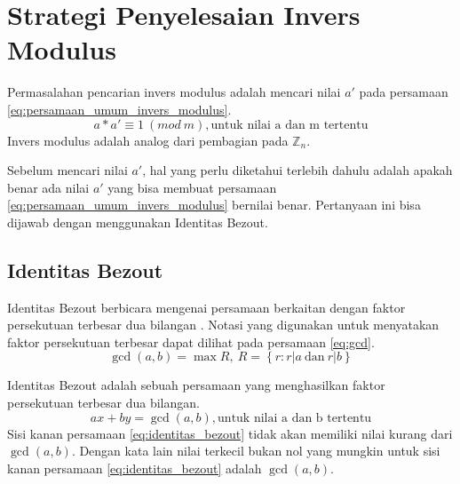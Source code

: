 \section{Strategi Penyelesaian Invers Modulus}

Permasalahan pencarian invers modulus adalah mencari nilai $ a' $ pada persamaan \eqref{eq:persamaan_umum_invers_modulus}.
\begin{equation}
a * a' \equiv 1\ (mod\ m), \text{untuk nilai a dan m tertentu}
\label{eq:persamaan_umum_invers_modulus}
\end{equation}
Invers modulus adalah analog dari pembagian pada $ \mathbb{Z}_n $.

Sebelum mencari nilai $ a' $, hal yang perlu diketahui terlebih dahulu adalah apakah benar ada nilai $ a' $ yang bisa membuat persamaan \eqref{eq:persamaan_umum_invers_modulus} bernilai benar. Pertanyaan ini bisa dijawab dengan menggunakan Identitas Bezout.

\subsection{Identitas Bezout}

Identitas Bezout berbicara mengenai persamaan berkaitan dengan faktor persekutuan terbesar dua bilangan \cite{brilliant_bezout}. Notasi yang digunakan untuk menyatakan faktor persekutuan terbesar dapat dilihat pada persamaan \eqref{eq:gcd}.
\begin{equation}
\gcd⁡(a,b)=\max R,\ R=\left\{r:r|a\ \text{dan} \ r|b\right\}
\label{eq:gcd}
\end{equation}

Identitas Bezout adalah sebuah persamaan yang menghasilkan faktor persekutuan terbesar dua bilangan.
\begin{equation}
ax+by=\gcd(a,b), \text{untuk nilai a dan b tertentu}
\label{eq:identitas_bezout}
\end{equation}
Sisi kanan persamaan \eqref{eq:identitas_bezout} tidak akan memiliki nilai kurang dari $ \gcd (a,b) $. Dengan kata lain nilai terkecil bukan nol yang mungkin untuk sisi kanan persamaan \eqref{eq:identitas_bezout} adalah $ \gcd (a,b) $.

